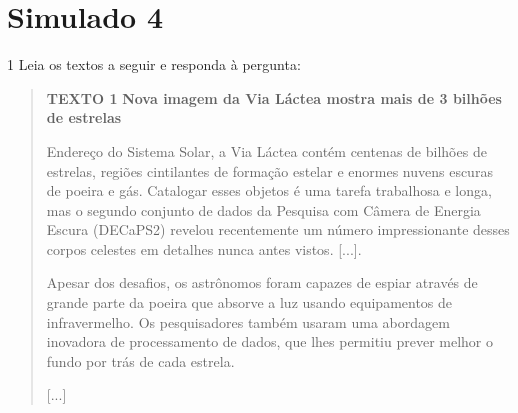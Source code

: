 
\chapter{Simulado 4}

\num{1} Leia os textos a seguir e responda à pergunta:

\begin{quote}
\textbf{TEXTO 1}
\textbf{Nova imagem da Via Láctea mostra mais de 3 bilhões de
estrelas}

Endereço do Sistema Solar, a Via Láctea contém centenas de bilhões de
estrelas, regiões cintilantes de formação estelar e enormes nuvens
escuras de poeira e gás. Catalogar esses objetos é uma tarefa trabalhosa
e longa, mas o segundo conjunto de dados da Pesquisa com Câmera de
Energia Escura (DECaPS2) revelou recentemente um número impressionante
desses corpos celestes em detalhes nunca antes vistos. {[}...{]}.

Apesar dos desafios, os astrônomos foram capazes de espiar através de
grande parte da poeira que absorve a luz usando equipamentos de
infravermelho. Os pesquisadores também usaram uma abordagem inovadora de
processamento de dados, que lhes permitiu prever melhor o fundo por trás
de cada estrela.

{[}...{]}

\end{quote}

